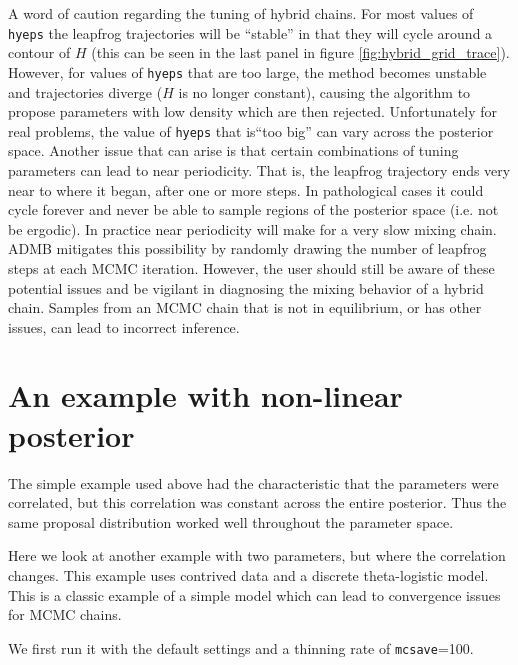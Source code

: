 \documentclass{article}\usepackage[]{graphicx}\usepackage[]{color}
\begin{document}
A word of caution regarding the tuning of hybrid chains. For
most values of \texttt{hyeps} the leapfrog trajectories will
be ``stable'' in that they will cycle around a contour of
$H$ (this can be seen in the last panel in figure
\ref{fig:hybrid_grid_trace}). However, for values of
\texttt{hyeps} that are too large, the method becomes
unstable and trajectories diverge ($H$ is no longer
constant), causing the algorithm to propose parameters with
low density which are then rejected. Unfortunately for real
problems, the value of \texttt{hyeps} that is``too big'' can
vary across the posterior space.  Another issue that can
arise is that certain combinations of tuning parameters can
lead to near periodicity. That is, the leapfrog trajectory
ends very near to where it began, after one or more
steps. In pathological cases it could cycle forever and
never be able to sample regions of the posterior space
(i.e. not be ergodic). In practice near periodicity will
make for a very slow mixing chain. ADMB mitigates this
possibility by randomly drawing the number of leapfrog steps
at each MCMC iteration. However, the user should still be
aware of these potential issues and be vigilant in
diagnosing the mixing behavior of a hybrid chain. Samples
from an MCMC chain that is not in equilibrium, or has other
issues, can lead to incorrect inference.

\section{An example with non-linear posterior}
The simple example used above had the characteristic that
the parameters were correlated, but this correlation was
constant across the entire posterior. Thus the same proposal
distribution worked well throughout the parameter space.

Here we look at another example with two parameters, but
where the correlation changes. This example uses contrived
data and a discrete theta-logistic model. This is a classic
example of a simple model which can lead to convergence
issues for MCMC chains.

We first run it with the default settings and a thinning
rate of \texttt{mcsave}=100.
\end{document}
